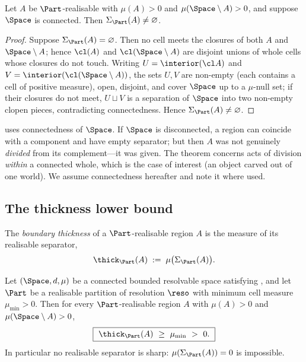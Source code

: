 \begin{lemma}
\label{lem:nonempty-sep}
Let $A$ be $\Part$-realisable with $\mu(A)>0$ and $\mu(\Space\setminus A)>0$, and
suppose $\Space$ is connected. Then $\Sigma_\Part(A)\neq\varnothing$.
\end{lemma}

\begin{proof}
Suppose $\Sigma_\Part(A)=\varnothing$. Then no cell meets the closures of both
$A$ and $\Space\setminus A$; hence $\cl(A)$ and $\cl(\Space\setminus A)$ are
disjoint unions of whole cells whose closures do not touch. Writing
$U=\interior(\cl A)$ and $V=\interior(\cl(\Space\setminus A))$, the sets $U,V$
are non-empty (each contains a cell of positive measure), open, disjoint, and
cover $\Space$ up to a $\mu$-null set; if their closures do not meet, $U\sqcup V$
is a separation of $\Space$ into two non-empty clopen pieces, contradicting
connectedness. Hence $\Sigma_\Part(A)\neq\varnothing$.
\end{proof}

\begin{remark}[Connectedness]
 uses connectedness of $\Space$. If $\Space$ is
disconnected, a region can coincide with a component and have empty separator;
but then $A$ was not genuinely \emph{divided} from its complement---it was given.
The theorem concerns acts of division \emph{within} a connected whole, which is
the case of interest (an object carved out of one world). We assume connectedness
hereafter and note it where used.
\end{remark}

\subsection{The thickness lower bound}

\begin{definition}
\label{def:thickness}
The \emph{boundary thickness} of a $\Part$-realisable region $A$ is the measure
of its realisable separator,
\[
\thick_\Part(A)\;:=\;\mu\bigl(\Sigma_\Part(A)\bigr).
\]
\end{definition}

\begin{theorem}
\label{thm:thickness}
Let $(\Space,d,\mu)$ be a connected bounded resolvable space satisfying
, and let $\Part$ be a realisable partition of resolution $\reso$
with minimum cell measure $\mu_{\min}>0$. Then for every $\Part$-realisable
region $A$ with $\mu(A)>0$ and $\mu(\Space\setminus A)>0$,
\[
\boxed{\ \thick_\Part(A)\ \ge\ \mu_{\min}\ >\ 0.\ }
\]
In particular no realisable separator is sharp: $\mu(\Sigma_\Part(A))=0$ is
impossible.
\end{theorem}

